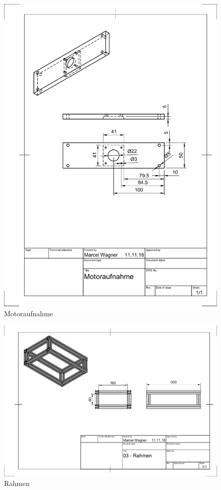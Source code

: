 \begin{figure}
	\includegraphics[width=\textwidth]{images/Mechanik/Motoraufnahme}
	\caption{Motoraufnahme}
\end{figure}
\begin{figure}
	\includegraphics[angle=90,origin=c, width=\textwidth]{images/Mechanik/Rahmen}
	\caption{Rahmen}
\end{figure}


